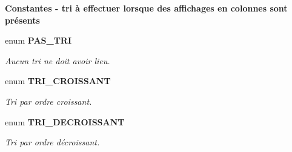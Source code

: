 \begin{Indent}{\bf Constantes - tri à effectuer lorsque des affichages en colonnes sont présents}\par
\begin{CompactItemize}
\item 
enum {\bf PAS\_\-TRI} 
\begin{CompactList}\small\item\em Aucun tri ne doit avoir lieu. \item\end{CompactList}\item 
enum {\bf TRI\_\-CROISSANT} 
\begin{CompactList}\small\item\em Tri par ordre croissant. \item\end{CompactList}\item 
enum {\bf TRI\_\-DECROISSANT} 
\begin{CompactList}\small\item\em Tri par ordre décroissant. \item\end{CompactList}\end{CompactItemize}
\end{Indent}
